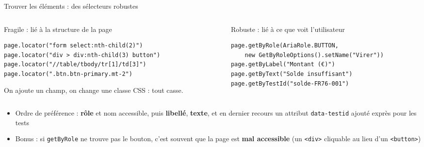 \documentclass[aspectratio=169,10pt]{beamer}
\begin{document}
\begin{frame}[fragile]{Trouver les éléments : des sélecteurs robustes}
  \begin{columns}[T]
    \begin{column}{0.5\textwidth}
      \begin{alertblock}{Fragile : lié à la structure de la page}
\begin{lstlisting}[basicstyle=\lstcode\scriptsize]
page.locator("form select:nth-child(2)")
page.locator("div > div:nth-child(3) button")
page.locator("//table/tbody/tr[1]/td[3]")
page.locator(".btn.btn-primary.mt-2")
\end{lstlisting}
        \small On ajoute un champ, on change une classe CSS : tout casse.
      \end{alertblock}
    \end{column}
    \begin{column}{0.46\textwidth}
      \begin{exampleblock}{Robuste : lié à ce que voit l'utilisateur}
\begin{lstlisting}[basicstyle=\lstcode\scriptsize]
page.getByRole(AriaRole.BUTTON,
    new GetByRoleOptions().setName("Virer"))
page.getByLabel("Montant (€)")
page.getByText("Solde insuffisant")
page.getByTestId("solde-FR76-001")
\end{lstlisting}
      \end{exampleblock}
    \end{column}
  \end{columns}
  \vspace{2mm}
  \small
  \begin{itemize}
    \item Ordre de préférence : \textbf{rôle} et nom accessible, puis \textbf{libellé}, \textbf{texte}, et en dernier recours un attribut \texttt{data-testid} ajouté exprès pour les tests
    \item Bonus : si \texttt{getByRole} ne trouve pas le bouton, c'est souvent que la page est \textbf{mal accessible} (un \texttt{<div>} cliquable au lieu d'un \texttt{<button>})
  \end{itemize}
\end{frame}
\end{document}
